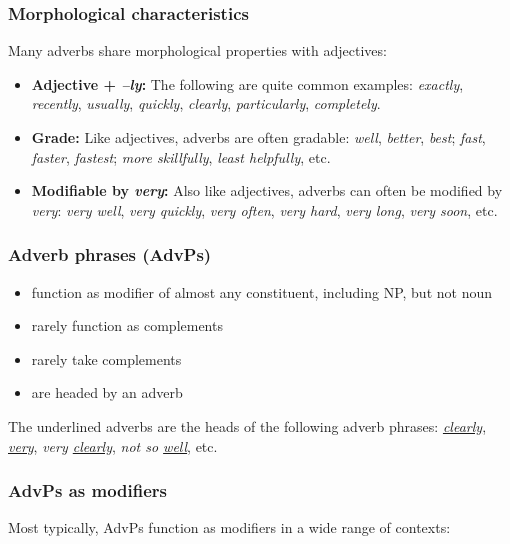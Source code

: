 \subsubsection*{Morphological characteristics}
Many adverbs share morphological properties with adjectives:
\begin{itemize}
   \item \textbf{Adjective + \textit{--ly}:} The following are quite common examples: \textit{exactly}, \textit{recently}, \textit{usually}, \textit{quickly}, \textit{clearly}, \textit{particularly}, \textit{completely}.
   \item \textbf{Grade:} Like adjectives, adverbs are often gradable: \textit{well}, \textit{better}, \textit{best}; \textit{fast}, \textit{faster}, \textit{fastest}; \textit{more skillfully}, \textit{least helpfully}, etc.
   \item \textbf{Modifiable by \textit{very}:} Also like adjectives, adverbs can often be modified by \textit{very}: \textit{very well}, \textit{very quickly}, \textit{very often}, \textit{very hard}, \textit{very long}, \textit{very soon}, etc.
\end{itemize}

\subsubsection*{Adverb phrases (AdvPs)} \label{sec:advps}

\begin{itemize}
   \item function as modifier of almost any constituent, including NP, but not noun
   \item rarely function as complements
   \item rarely take complements
   \item are headed by an adverb
\end{itemize}

The underlined adverbs are the heads of the following adverb phrases: \textit{\uline{clearly}}, \textit{\uline{very}}, \textit{very \uline{clearly}}, \textit{not so \uline{well}}, etc.

\subsubsection*{AdvPs as modifiers}

Most typically, AdvPs function as modifiers in a wide range of contexts:

